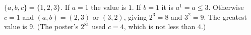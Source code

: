 $\{a,b,c\}=\{1,2,3\}$. If $a=1$ the value is $1$. If $b=1$ it is $a^1=a\le3$. Otherwise $c=1$ and $(a,b)=(2,3)$ or $(3,2)$, giving $2^{3}=8$ and $3^{2}=9$. The greatest value is $\boxed{9}$. (The poster's $2^{81}$ used $c=4$, which is not less than $4$.)
